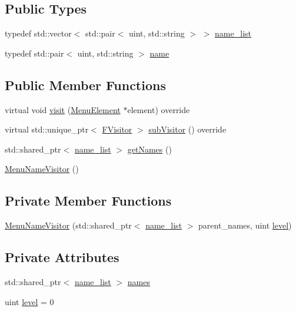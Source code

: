 \subsection*{Public Types}
\begin{DoxyCompactItemize}
\item 
typedef std\+::vector$<$ std\+::pair$<$ uint, std\+::string $>$ $>$ \hyperlink{classMenuNameVisitor_a8feb2ed73ab4a09c56a7f87ddd2d0478}{name\+\_\+list}
\item 
typedef std\+::pair$<$ uint, std\+::string $>$ \hyperlink{classMenuNameVisitor_a1ce6e7b626afbbcaa26785596900f531}{name}
\end{DoxyCompactItemize}
\subsection*{Public Member Functions}
\begin{DoxyCompactItemize}
\item 
virtual void \hyperlink{classMenuNameVisitor_a1289c718c9e60e329e68e6900c19be0f}{visit} (\hyperlink{classMenuElement}{Menu\+Element} $\ast$element) override
\item 
virtual std\+::unique\+\_\+ptr$<$ \hyperlink{classFVisitor}{F\+Visitor} $>$ \hyperlink{classMenuNameVisitor_af766a058c692473485472ea569d5a54f}{sub\+Visitor} () override
\item 
std\+::shared\+\_\+ptr$<$ \hyperlink{classMenuNameVisitor_a8feb2ed73ab4a09c56a7f87ddd2d0478}{name\+\_\+list} $>$ \hyperlink{classMenuNameVisitor_a9a8aead92197c2d1d63c5fa61b8f0b36}{get\+Names} ()
\item 
\hyperlink{classMenuNameVisitor_a17b31fe2e049705f3af50ecf9da00777}{Menu\+Name\+Visitor} ()
\end{DoxyCompactItemize}
\subsection*{Private Member Functions}
\begin{DoxyCompactItemize}
\item 
\hyperlink{classMenuNameVisitor_abba7f7e2b39a69a8ecc20eb570202e00}{Menu\+Name\+Visitor} (std\+::shared\+\_\+ptr$<$ \hyperlink{classMenuNameVisitor_a8feb2ed73ab4a09c56a7f87ddd2d0478}{name\+\_\+list} $>$ parent\+\_\+names, uint \hyperlink{classMenuNameVisitor_a77280f5654e700b95c1e22d32ae616fa}{level})
\end{DoxyCompactItemize}
\subsection*{Private Attributes}
\begin{DoxyCompactItemize}
\item 
std\+::shared\+\_\+ptr$<$ \hyperlink{classMenuNameVisitor_a8feb2ed73ab4a09c56a7f87ddd2d0478}{name\+\_\+list} $>$ \hyperlink{classMenuNameVisitor_a7237e6e9df65d870a95add62b07d1176}{names}
\item 
uint \hyperlink{classMenuNameVisitor_a77280f5654e700b95c1e22d32ae616fa}{level} = 0
\end{DoxyCompactItemize}



